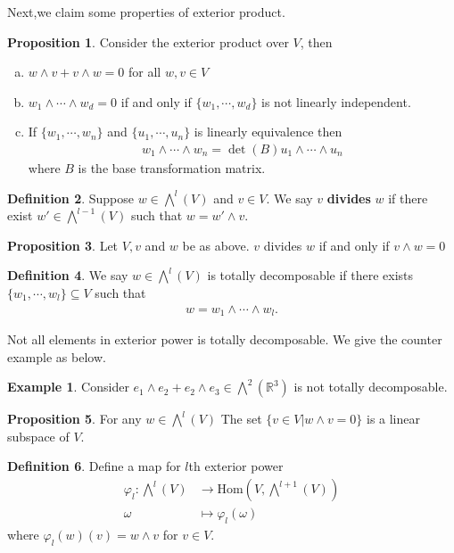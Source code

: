 \documentclass[10pt,UTF8]{article}
\theoremstyle{definition}
\renewcommand{\hom}{\text{Hom}}
\newtheorem{definition}{Definition}[section]
\newtheorem{proposition}[definition]{Proposition}
\newtheorem*{example}{Example}
\begin{document}
Next,we claim some properties of exterior product.
\begin{proposition}
  Consider the exterior product over $V$, then \label{252}
  \begin{enumerate}[a)]
    \item $w\wedge v + v\wedge w = 0$ for all $w,v\in V$
    \item $w_1\wedge\cdots\wedge w_d =0$ if and only if $\{w_1,\cdots,w_d\}$ is not linearly independent.
    \item If $\{w_1,\cdots,w_n\}$ and $\{u_1,\cdots,u_n\}$ is linearly equivalence then 
    \begin{align*}
      w_1\wedge\cdots \wedge w_n = \det(B) u_1\wedge\cdots \wedge u_n 
    \end{align*}
    where $B$ is the base transformation matrix. 
  \end{enumerate}
\end{proposition}


\begin{definition}
  Suppose $w\in \bigwedge^l(V)$ and $v\in V$. We say $v$ \textbf{divides} $w$ if there exist $w'\in\bigwedge^{l-1}(V)$ such that $w=w'\wedge v$.
\end{definition}
\begin{proposition}
  Let $V,v$ and $w$ be as above. $v$ divides $w$ if and only if $v\wedge w=0$
\end{proposition}
\begin{definition}
  We say $w\in \bigwedge^l(V)$ is totally decomposable if there exists $\{w_1,\cdots,w_l\}\subseteq V$ such that 
  \begin{align*}
    w = w_1\wedge \cdots \wedge w_l.
  \end{align*}
\end{definition}
Not all elements in exterior power is totally decomposable. We give the counter example as below.
\begin{example}
  Consider $e_1\wedge e_2 + e_2\wedge e_3\in \bigwedge^2(\mathbb{R}^3)$ is not totally decomposable.
\end{example}
\begin{proposition}
  For any $w\in\bigwedge^l(V)$
  The set $\{v\in V|w\wedge v=0\}$ is a linear subspace of $V$.
\end{proposition}

\begin{definition}
  Define a map for $l$th exterior power
  \begin{align*}
    \varphi_l:  \bigwedge^{l}(V) &\to \hom\left(V,\bigwedge^{l+1}(V)\right) \\
    \omega &\mapsto \varphi_l(\omega) 
  \end{align*}
  where $\varphi_l(w)(v) = w\wedge v$ for $v\in V$. 
\end{definition}
\end{document}
